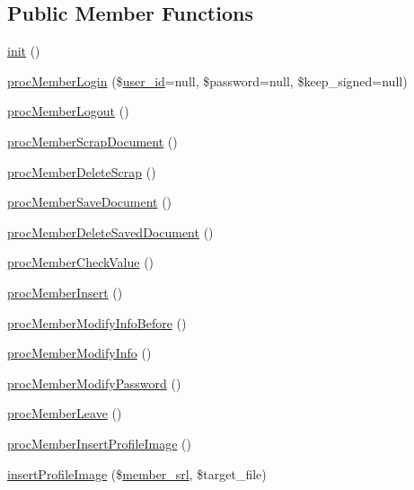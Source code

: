 \subsection*{Public Member Functions}
\begin{DoxyCompactItemize}
\item 
\hyperlink{classmemberController_a1de8a45f3b986e23bbf60d685f8d779d}{init} ()
\item 
\hyperlink{classmemberController_a1e37a85198193c84a66b4472a677960d}{proc\+Member\+Login} (\$\hyperlink{ko_8install_8php_a74f1a394389d774e5b4cd5d1d15413f7}{user\+\_\+id}=null, \$password=null, \$keep\+\_\+signed=null)
\item 
\hyperlink{classmemberController_a9b27cafc18ca21df327c49842987c829}{proc\+Member\+Logout} ()
\item 
\hyperlink{classmemberController_a7c582f99e2bda6a956a7a2a33a01c6c6}{proc\+Member\+Scrap\+Document} ()
\item 
\hyperlink{classmemberController_ae1eb0a3ef4da18d06c4fce0dc4fbbe24}{proc\+Member\+Delete\+Scrap} ()
\item 
\hyperlink{classmemberController_abe77500da26f14cd629ca373f94e04d1}{proc\+Member\+Save\+Document} ()
\item 
\hyperlink{classmemberController_a4e154a138901b9b941f9949576c47f00}{proc\+Member\+Delete\+Saved\+Document} ()
\item 
\hyperlink{classmemberController_ac9e9ed09b49a295c94a4c3bad239757f}{proc\+Member\+Check\+Value} ()
\item 
\hyperlink{classmemberController_a8f176054f72833b01e2229108da0b599}{proc\+Member\+Insert} ()
\item 
\hyperlink{classmemberController_ac7a79ff38569abb383495b4d796eba69}{proc\+Member\+Modify\+Info\+Before} ()
\item 
\hyperlink{classmemberController_abe0dc1c6680e07a0189e53a10a7651f2}{proc\+Member\+Modify\+Info} ()
\item 
\hyperlink{classmemberController_ae62edfe1a880c94c02fba4c04b22add3}{proc\+Member\+Modify\+Password} ()
\item 
\hyperlink{classmemberController_a4c78a9114c62d27178d70bb4b8d19455}{proc\+Member\+Leave} ()
\item 
\hyperlink{classmemberController_ac8b43955581e87f21c77ee741f633a66}{proc\+Member\+Insert\+Profile\+Image} ()
\item 
\hyperlink{classmemberController_af7334a64b7530387a5f761935d042933}{insert\+Profile\+Image} (\$\hyperlink{ko_8install_8php_aa61f9e08f0fe505094d26f8143f30bbd}{member\+\_\+srl}, \$target\+\_\+file)

\end{DoxyCompactItemize}
